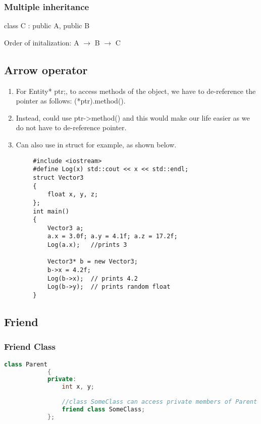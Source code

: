 \documentclass{article}
\begin{document}
        \subsubsection{Multiple inheritance}
        class C : public A, public B
        
        Order of initalization: A $\rightarrow$ B $\rightarrow$ C
        
    \subsection{Arrow operator}
    \begin{enumerate}
        \item For Entity* ptr;, to access methods of the object, we have to de-reference the pointer as follows: (*ptr).method().
        \item Instead, could use ptr->method() and this would make our life easier as we do not have to de-reference pointer.
        \item Can also use in struct for example, as shown below.
    \end{enumerate}
    
    \begin{lstlisting}
        #include <iostream>
        #define Log(x) std::cout << x << std::endl;
        struct Vector3
        {
        	float x, y, z;
        };
        int main()
        {
            Vector3 a;
        	a.x = 3.0f; a.y = 4.1f; a.z = 17.2f;
        	Log(a.x);	//prints 3
        
        	Vector3* b = new Vector3;
        	b->x = 4.2f;
        	Log(b->x);	// prints 4.2
        	Log(b->y);	// prints random float
    	}
    \end{lstlisting}
    
    
    
    
    \subsection{Friend}
        \subsubsection{Friend Class}
        \begin{lstlisting}[language=C++, caption=Friend Class]
            class Parent
            {
            private:
                int x, y;
                
                //class SomeClass can access private members of Parent class.
                friend class SomeClass;
            };
        \end{lstlisting}
        
\end{document}
